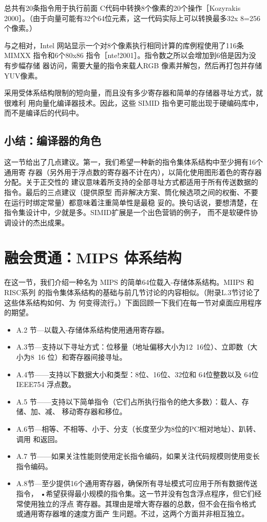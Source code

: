 总共有20条指令用于执行前面 C代码中转换8个像素的20个操作［Kozyrakis
2000］。（由于向量可能有32个64位元素，这一代码实际上可以转换最多32x
8=256个像索。）

与之相对，Intel 网站显示一个对8个像素执行相同计算的库例程使用了116条 MIMXX
指令和6个80x86 指令［nte!2001］。指令数之所以会增加到6倍是因为没有步幅存储
器访问，需要大量的指令来载人RGB 像素并解包，然后再打包并存储YUV像素。

采用受体系结构限制的短向量，而且没有多少寄存器和简单的存储器寻址方式，就很难利
用向量化编译器技术。因此，这些 SIMID 指令更可能出现于硬编码库中，而不是编译后的代码中。

\subsection{小结：编译器的角色}

这一节给出了几点建议。第一，我们希望一种新的指令集体系结构中至少拥有16个通用寄
存器（另外用于浮点数的寄存器不计在内），以简化使用图形着色的寄存器分配。关于正交性的
建议意味着所支持的全部寻址方式都适用于所有传送数据的指令。最后的三点建议（提供原型
而非解决方案、筒化候选项之间的权衡、不要在运行时绑定常量）都意味着注重简单性是最稳
妥的。换句话说，要想清楚，在指令集设计中，少就是多。SIMID扩展是一个出色营销的例子，
而不是软硬件协调设计的杰出成果。

\section{融会贯通：MIPS 体系结构}

在这一节，我们介绍一种名为 MIPS 的简单64位载入-存储体系结构。MIIPS 和RISC系列
的指令集体系结构的基础与前几节讨论的内容相似。（附录L.3节讨论了这些体系结构如何、为
何变得流行。）下面回顾一下我们在每一节对桌面应用程序的期望。

\begin{itemize}
    \item A.2 节—以载入-存储体系结构使用通用寄存器。
    \item A.3节—支持以下寻址方式：位移量（地址偏移大小为12~16位）、立即数（大小为8~16
    位）和寄存器间接寻址。
    \item A.4节——支持以下数据大小和类型：8位、16位、32位和 64位整数以及 64位 IEEE754
    浮点数。
    \item A.5 节——支持以下简单指令（它们占所执行指令的绝大多数）：载人、存储、加、减、
    移动寄存器和移位。
    \item A.6节—相等、不相等、小于、分支（长度至少为8位的PC相对地址）、趴转、调用
    和返回。
    \item A.7 节——如果关注性能则使用定长指令编码，如果关注代码规模则使用变长指令编码。
    \item A.8节—至少提供16个通用寄存器，确保所有寻址模式可应用于所有数据传送指令，
    •希望获得最小规模的指令集。这一节并没有包含浮点程序，但它们经常使用独立的浮点
    寄存器。其理由是增大寄存器的总数，但不会在指令格式或通用寄存器堆的速度方面产
    生问题。不过，这两个方面并非相互独立。
\end{itemize}

